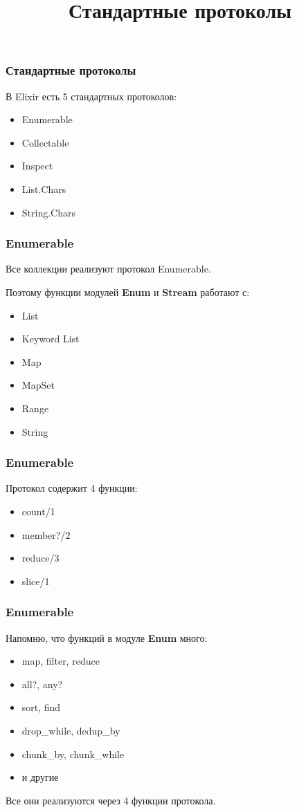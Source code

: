 \documentclass[10pt]{beamer}
\title{Стандартные протоколы}
\begin{document}
\begin{frame}
  \frametitle{Стандартные протоколы}
  В Elixir есть 5 стандартных протоколов:
  \par \bigskip
  \begin{itemize}
  \item Enumerable
  \item Collectable
  \item Inspect
  \item List.Chars
  \item String.Chars
  \end{itemize}
\end{frame}

\begin{frame}
  \frametitle{Enumerable}
  Все коллекции реализуют протокол Enumerable.
  \par \bigskip
  Поэтому функции модулей \textbf{Enum} и \textbf{Stream} работают с:
  \par \bigskip
  \begin{itemize}
  \item List
  \item Keyword List
  \item Map
  \item MapSet
  \item Range
  \item String
  \end{itemize}
\end{frame}

\begin{frame}
  \frametitle{Enumerable}
  Протокол содержит 4 функции:
  \par \bigskip
  \begin{itemize}
  \item count/1
  \item member?/2
  \item reduce/3
  \item slice/1
  \end{itemize}
\end{frame}

\begin{frame}
  \frametitle{Enumerable}
  Напомню, что функций в модуле \textbf{Enum} много:
  \par \bigskip
  \begin{itemize}
  \item map, filter, reduce
  \item all?, any?
  \item sort, find
  \item drop\_while, dedup\_by
  \item chunk\_by, chunk\_while
  \item и другие
  \end{itemize}
  \par \bigskip
  Все они реализуются через 4 функции протокола.
\end{frame}
\end{document}

